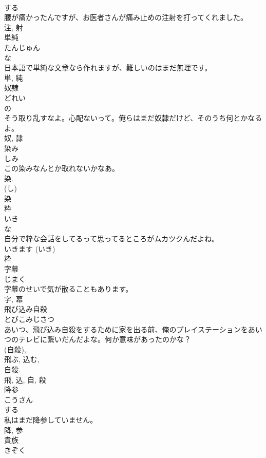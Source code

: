 \documentclass[8pt]{extreport}
\begin{document}
\begin{CJK}{UTF8}{min}
\\	する 
\\	腰が痛かったんですが、お医者さんが痛み止めの注射を打ってくれました。	
\\	注, 射	
\\	単純	
\\	たんじゅん	
\\	な 
\\	日本語で単純な文章なら作れますが、難しいのはまだ無理です。	
\\	単, 純	
\\	奴隷	
\\	どれい	
\\	の 
\\	そう取り乱すなよ。心配ないって。俺らはまだ奴隷だけど、そのうち何とかなるよ。	
\\	奴, 隷	
\\	染み	
\\	しみ	
\\	この染みなんとか取れないかなあ。	
\\	染. 
\\	(し) 
\\	染	
\\	粋	
\\	いき	
\\	な 
\\	自分で粋な会話をしてるって思ってるところがムカツクんだよね。	
\\	いきます (いき) 
\\	粋	
\\	字幕	
\\	じまく	
\\	字幕のせいで気が散ることもあります。	
\\	字, 幕	
\\	飛び込み自殺	
\\	とびこみじさつ	
\\	あいつ、飛び込み自殺をするために家を出る前、俺のプレイステーションをあいつのテレビに繋いだんだよな。何か意味があったのかな？	
\\	(自殺), 
\\	飛ぶ, 込む, 
\\	自殺. 
\\	飛, 込, 自, 殺	
\\	降参	
\\	こうさん	
\\	する 
\\	私はまだ降参していません。	
\\	降, 参	
\\	貴族	
\\	きぞく	

\end{CJK}
\end{document}
